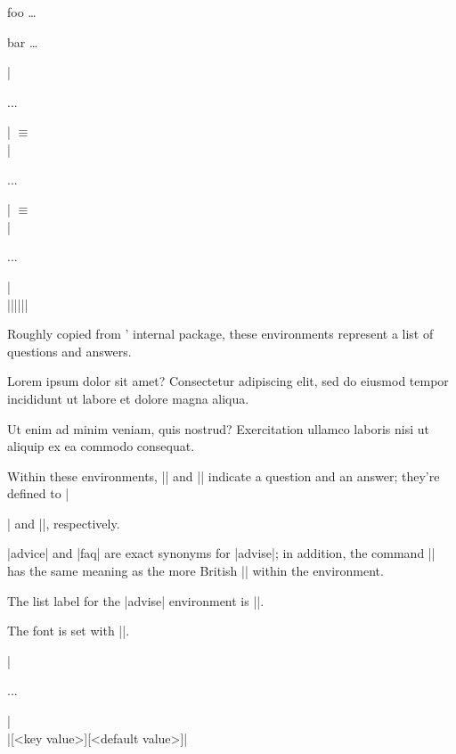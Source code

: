 \documentclass{ltxguidex}
\begin{document}
\begin{LTXexample}
\begin{options}
    \item[foo] \dots
    \item[bar] \dots
\end{options}
\end{LTXexample}

\begin{desc}
|\begin{advise}...\end{advise}| $\equiv$\\
|\begin{advice}...\end{advice}| $\equiv$\\
|\begin{faq}...\end{faq}|\\
|\Q|\qquad|\A|\qquad|\advisespace|
\end{desc}

Roughly copied from ' internal  package,
these environments represent a list of questions and answers.

\begin{LTXexample}
\begin{faq}
\Q Lorem ipsum dolor sit amet?
\A Consectetur adipiscing elit, sed do eiusmod tempor incididunt ut labore et dolore magna aliqua.

\Q Ut enim ad minim veniam, quis nostrud?
\A Exercitation ullamco laboris nisi ut aliquip ex ea commodo consequat.
\end{faq}
\end{LTXexample}

Within these environments, |\Q| and |\A| indicate a question and an answer;
they're defined to |\item| and |\advisespace|, respectively.

\begin{note}
	|advice| and |faq| are exact synonyms for |advise|; in addition, the
	command |\advicespace| has the same meaning as the more British
	|\advisespace| within the environment.

	The list label for the |advise| environment is ||.

	The font is set with |\advisestyle|.
\end{note}

\begin{desc}
|\begin{keys}...\end{keys}|\\
|[<key value>][<default value>]|
\end{desc}
\end{document}

